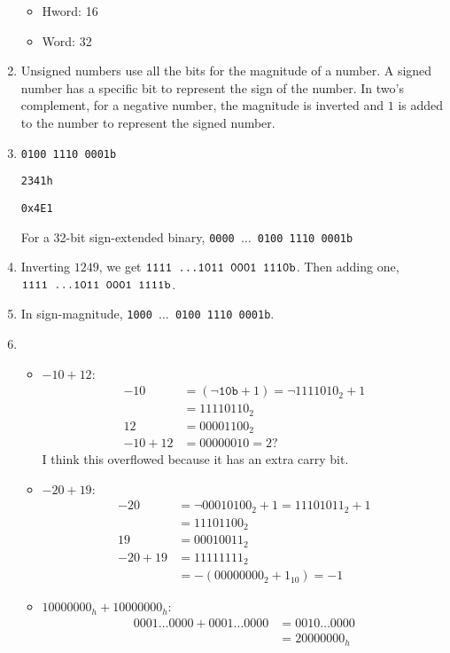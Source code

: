 \documentclass{homework}
\begin{document}
\begin{enumerate}
\begin{itemize}
			\item Hword: 16
			
			\item Word: 32
		\end{itemize}
	
		\item Unsigned numbers use all the bits for the magnitude of a number. A signed number has a specific bit to represent the sign of the number. In two's complement, for a negative number, the magnitude is inverted and $1$ is added to the number to represent the signed number. 
		
		\item \texttt{0100 1110 0001b}
		
			\texttt{2341h}
			
			\texttt{0x4E1}
			
			For a 32-bit sign-extended binary, \texttt{0000 $\dots$ 0100 1110 0001b}
			
		\item Inverting $1249$, we get $\texttt{1111 \dots 1011 0001 1110b}$. Then adding one, $\texttt{1111 \dots 1011 0001 1111b}$.
		
		\item In sign-magnitude, \texttt{1000 $\dots$ 0100 1110 0001b}.
		
		\item \begin{itemize}
			\item $-10+12$: \begin{align*}
				-10 & = (\neg\texttt{10b} + 1) = \neg 1111010_2 + 1 \\
					& = 11110110_2 \\
				12 & =  00001100_2 \\
				-10 + 12 & = 0000 0010 = 2?
			\end{align*}
			I think this overflowed because it has an extra carry bit.
		
			\item $-20+19$: \begin{align*}
				-20 & = \neg 0001 0100_2 + 1 = 1110 1011_2 + 1 \\
					& = 1110 1100_2 \\
				19 & =  0001 0011_2 \\
				-20 + 19 & = 11111111_2 \\
					& = -(0000 0000_2 + 1_{10}) = -1
			\end{align*}
		
			\item $10000000_h + 10000000_h$: \begin{align*}
				0001\dots0000 + 0001\dots0000 & = 0010\dots0000 \\
					& = 20000000_h
			\end{align*}
		\end{itemize}
	\end{enumerate}
\end{document}
